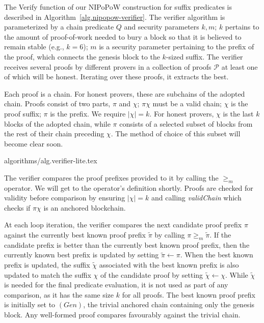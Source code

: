 The \textsf{Verify} function of our NIPoPoW construction  for suffix predicates
is described in Algorithm~\ref{alg.nipopow-verifier}. The verifier algorithm is
parameterized by a chain predicate $Q$ and security parameters $k, m$; $k$
pertains to the amount of proof-of-work needed to bury a block so that it is
believed to remain stable (e.g., $k = 6$); $m$ is a security parameter
pertaining to the prefix of the proof, which connects the genesis block to the
$k$-sized suffix. The verifier receives several proofs by different provers in a
collection of proofs $\mathcal{P}$ at least one of which will be honest.
Iterating over these proofs, it extracts the best.

Each proof is a chain. For honest provers, these are subchains of the  adopted
chain. Proofs consist of two parts, $\pi$ and $\chi$; $\pi \chi$ must be a valid
chain; $\chi$ is the proof suffix; $\pi$ is the prefix. We require $|\chi| = k$.
For honest provers, $\chi$ is the last $k$ blocks of the adopted chain, while
$\pi$ consists of a selected subset of blocks from the rest of their chain
preceding $\chi$. The method of choice of this subset will become clear soon.

{algorithms/alg.verifier-lite.tex}

The verifier compares the proof prefixes provided to it by calling the $\geq_m$
operator. We will get to the operator's definition shortly. Proofs are checked
for validity before comparison by ensuring $|\chi| = k$ and calling
\textit{validChain} which checks if $\pi\chi$ is an anchored blockchain.

At each loop iteration, the verifier compares the next candidate proof prefix
$\pi$ against the currently best known proof prefix $\tilde\pi$ by calling $\pi
\geq_m \tilde\pi$. If the candidate prefix is better than the currently best
known proof prefix, then the currently known best prefix is updated by setting
$\tilde\pi \leftarrow \pi$. When the best known prefix is updated, the suffix
$\tilde\chi$ associated with the best known prefix is also updated to match the
suffix $\chi$ of the candidate proof by setting $\tilde\chi \leftarrow \chi$.
While $\tilde\chi$ is needed for the final predicate evaluation, it is not used
as part of any comparison, as it has the same size $k$ for all proofs. The best
known proof prefix is initially set to $(Gen)$, the trivial anchored chain
containing only the genesis block. Any well-formed proof compares favourably
against the trivial chain.

